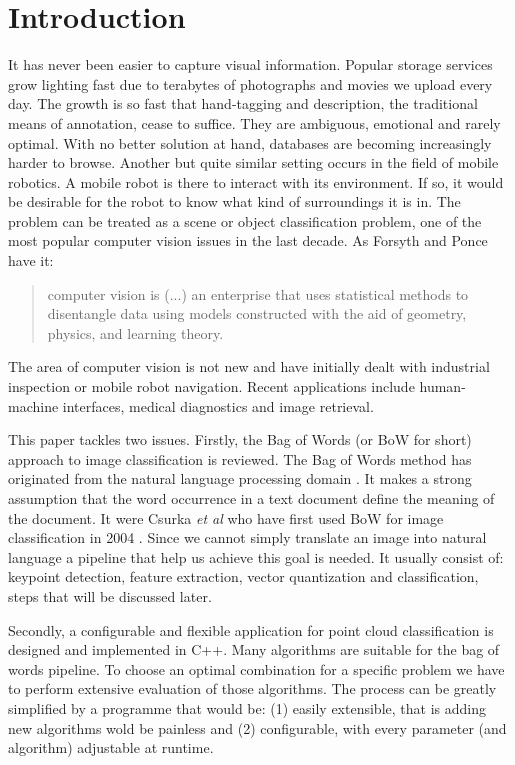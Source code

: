 \chapter{Introduction}

	It has never been easier to capture visual information. Popular storage services grow lighting fast due to terabytes of photographs and movies we upload every day. The growth is so fast that hand-tagging and description, the traditional means of annotation, cease to suffice. They are ambiguous, emotional and rarely optimal. With no better solution at hand, databases are becoming increasingly harder to browse. Another but quite similar setting occurs in the field of mobile robotics. A mobile robot is there to interact with its environment. If so, it would be desirable for the robot to know what kind of surroundings it is in. The problem can be treated as a scene or object classification problem, one of the most popular computer vision issues in the last decade. As Forsyth and Ponce \cite{ponce2011cv} have it:
	
	\begin{quote} 
		computer vision is (...) an enterprise that uses statistical methods to disentangle data using models constructed with the aid of geometry, physics, and learning theory.
	\end{quote} 
	
	The area of computer vision is not new and have initially dealt with industrial inspection or mobile robot navigation. Recent applications include human-machine interfaces, medical diagnostics and image retrieval.
	
	This paper tackles two issues. Firstly, the Bag of Words (or BoW for short) approach to image classification is reviewed. The Bag of Words method has originated from the natural language processing domain \cite{tsai2012bag}. It makes a strong assumption that the word occurrence in a text document define the meaning of the document. It were Csurka \textit{et al} who have first used BoW for image classification in 2004 \cite{csurka2004visual}. Since we cannot simply translate an image into natural language a pipeline that help us achieve this goal is needed. It usually consist of: keypoint detection, feature extraction, vector quantization and classification, steps that will be discussed later.
	
	Secondly, a configurable and flexible application for point cloud classification is designed and implemented in C++. Many algorithms are suitable for the bag of words pipeline. To choose an optimal combination for a specific problem we have to perform extensive evaluation of those algorithms. The process can be greatly simplified by a programme that would be: (1) easily extensible, that is adding new algorithms wold be painless and (2) configurable, with every parameter (and algorithm) adjustable at runtime.
	
